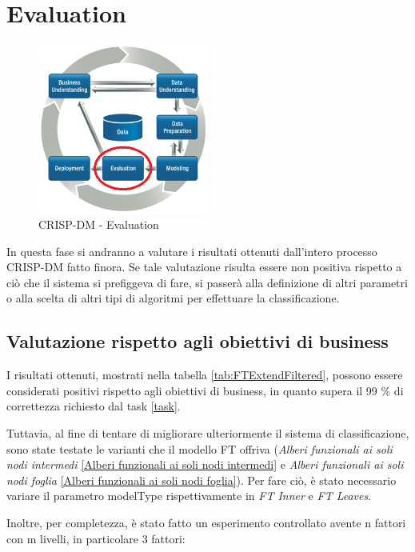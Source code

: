 \chapter{Evaluation}

\begin{figure}[hbtp]
	\centering
	\includegraphics[width=0.5\textwidth]{./images/CRISPDM_5.png}
	\caption{CRISP-DM - Evaluation}
	\label{CRISPDM_5}
\end{figure}

In questa fase si andranno a valutare i risultati ottenuti dall'intero processo CRISP-DM fatto finora. Se tale valutazione risulta essere non positiva rispetto a ciò che il sistema si prefiggeva di fare, si passerà alla definizione di altri parametri o alla scelta di altri tipi di algoritmi per effettuare la classificazione.

\section{Valutazione rispetto agli obiettivi di business}
I risultati ottenuti, mostrati nella tabella \ref{tab:FTExtendFiltered}, possono essere considerati positivi rispetto agli obiettivi di business, in quanto supera il 99 \% di correttezza richiesto dal task \ref{task}. 

Tuttavia, al fine di tentare di migliorare ulteriormente il sistema di classificazione, sono state testate le varianti che il modello FT offriva (\emph{Alberi funzionali ai soli nodi intermedi} \ref{Alberi funzionali ai soli nodi intermedi} e \emph{Alberi funzionali ai soli nodi foglia} \ref{Alberi funzionali ai soli nodi foglia}). Per fare ciò, è stato necessario variare il parametro modelType rispettivamente in \emph{FT Inner} e \emph{FT Leaves}.

Inoltre, per completezza, è stato fatto un esperimento controllato avente n fattori con m livelli, in particolare 3 fattori:

